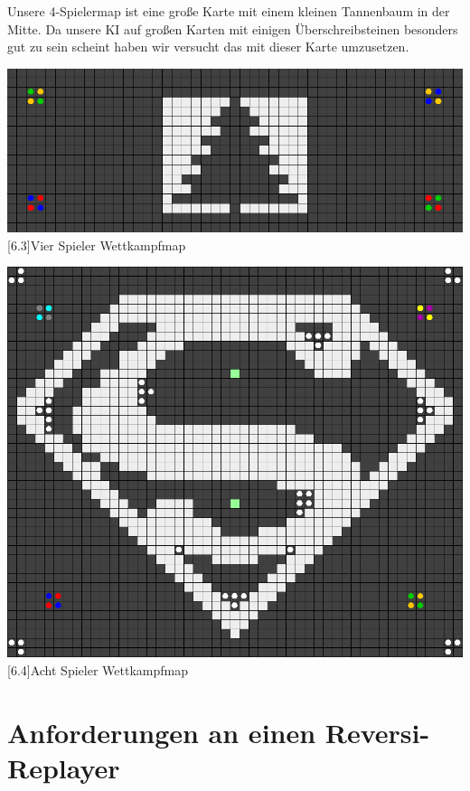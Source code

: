 \documentclass[12pt,a4paper,bibliography=totocnumbered,listof=totocnumbered]{scrartcl}
\begin{document}
	Unsere 4-Spielermap ist eine große Karte mit einem kleinen Tannenbaum in der Mitte. Da unsere KI auf großen Karten mit einigen Überschreibsteinen besonders gut zu sein scheint haben wir versucht das mit dieser Karte umzusetzen.
	
	\vspace{1em}
	\begin{minipage}{\linewidth}
		\centering
		\includegraphics[width=0.66\linewidth]{pics/Kapitel_6/TannenbaumMap.PNG}
		[6.3]{Vier Spieler Wettkampfmap}
		\label{fig:6.3}
	\end{minipage}
	\vspace{1em}
	
		\vspace{1em}
	\begin{minipage}{\linewidth}
		\centering
		\includegraphics[width=0.66\linewidth]{pics/Kapitel_6/SupermanMap.png}
		[6.4]{Acht Spieler Wettkampfmap}
		\label{fig:6.}
	\end{minipage}
	\vspace{1em}
	
	\section{Anforderungen an einen Reversi-Replayer}
	\vspace{1em}
	
\end{document}
